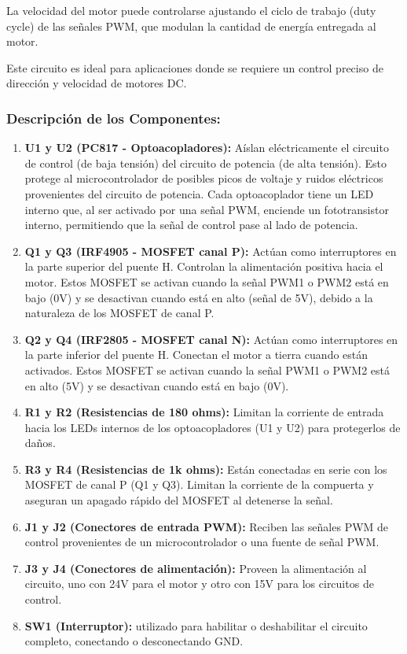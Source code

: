 \documentclass{article}
\begin{document}
La velocidad del motor puede controlarse ajustando el ciclo de trabajo (duty cycle) de las señales PWM, que modulan la cantidad de energía entregada al motor.

Este circuito es ideal para aplicaciones donde se requiere un control preciso de dirección y velocidad de motores DC.

\subsubsection{Descripción de los Componentes:}

\begin{enumerate}
    \item \textbf{U1 y U2 (PC817 - Optoacopladores):} Aíslan eléctricamente el circuito de control (de baja tensión) del circuito de potencia (de alta tensión). Esto protege al microcontrolador de posibles picos de voltaje y ruidos eléctricos provenientes del circuito de potencia.
    Cada optoacoplador tiene un LED interno que, al ser activado por una señal PWM, enciende un fototransistor interno, permitiendo que la señal de control pase al lado de potencia.
    \item \textbf{Q1 y Q3 (IRF4905 - MOSFET canal P):} Actúan como interruptores en la parte superior del puente H. Controlan la alimentación positiva hacia el motor. Estos MOSFET se activan cuando la señal PWM1 o PWM2 está en bajo (0V) y se desactivan cuando está en alto (señal de 5V), debido a la naturaleza de los MOSFET de canal P.
    \item \textbf{Q2 y Q4 (IRF2805 - MOSFET canal N):} Actúan como interruptores en la parte inferior del puente H. Conectan el motor a tierra cuando están activados. Estos MOSFET se activan cuando la señal PWM1 o PWM2 está en alto (5V) y se desactivan cuando está en bajo (0V).
    \item \textbf{R1 y R2 (Resistencias de 180 ohms):} Limitan la corriente de entrada hacia los LEDs internos de los optoacopladores (U1 y U2) para protegerlos de daños.
    \item \textbf{R3 y R4 (Resistencias de 1k ohms):} Están conectadas en serie con los MOSFET de canal P (Q1 y Q3). Limitan la corriente de la compuerta y aseguran un apagado rápido del MOSFET al detenerse la señal.
    \item \textbf{J1 y J2 (Conectores de entrada PWM):} Reciben las señales PWM de control provenientes de un microcontrolador o una fuente de señal PWM.
    \item \textbf{J3 y J4 (Conectores de alimentación):} Proveen la alimentación al circuito, uno con 24V para el motor y otro con 15V para los circuitos de control.
    \item \textbf{SW1 (Interruptor):}  utilizado para habilitar o deshabilitar el circuito completo, conectando o desconectando GND.
\end{enumerate}
\end{document}
